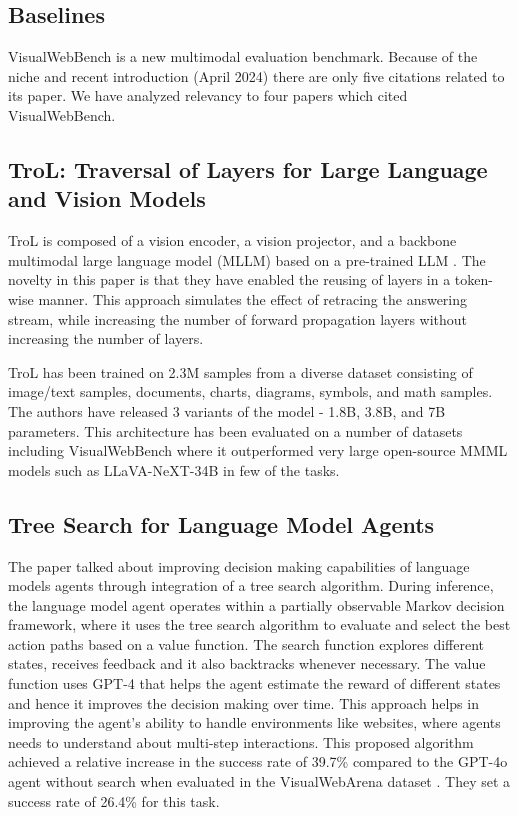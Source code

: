\documentclass[11pt,a4paper]{article}
\begin{document}
\subsection{Baselines} 
VisualWebBench is a new multimodal evaluation benchmark. Because of the niche and recent introduction (April 2024) there are only five citations related to its paper. We have analyzed relevancy to four papers which cited VisualWebBench.
\subsection*{TroL: Traversal of Layers for Large Language and Vision Models}

TroL is composed of a vision encoder, a vision projector, and a backbone multimodal large language model (MLLM) based on a pre-trained LLM \cite{lee2024troltraversallayerslarge}. The novelty in this paper is that they have enabled the reusing of layers in a token-wise manner.  This approach simulates the effect of retracing the answering stream, while increasing the number of forward propagation layers without increasing the number of layers.

\noindent TroL has been trained on 2.3M samples from a diverse dataset consisting of image/text samples, documents, charts, diagrams, symbols, and math samples. The authors have released 3 variants of the model - 1.8B, 3.8B, and 7B parameters. This architecture has been evaluated on a number of datasets including VisualWebBench where it outperformed very large open-source MMML models such as LLaVA-NeXT-34B in few of the tasks.

\subsection*{Tree Search for Language Model Agents}
The paper \cite{koh2024treesearchlanguagemodel} talked about improving decision making capabilities of language models agents through integration of a tree search algorithm. During inference, the language model agent operates within a partially observable Markov decision framework, where it uses the tree search algorithm to evaluate and select the best action paths based on a value function. The search function explores different states, receives feedback and it also backtracks whenever necessary. The value function uses GPT-4 that helps the agent estimate the reward of different states and hence it improves the decision making over time. This approach helps in improving the agent's ability to handle environments like websites, where agents needs to understand about multi-step interactions. This proposed algorithm achieved a relative increase in the success rate of 39.7\% compared to the GPT-4o agent without search when evaluated in the VisualWebArena dataset . They set a success rate of 26.4\% for this task.
\end{document}
